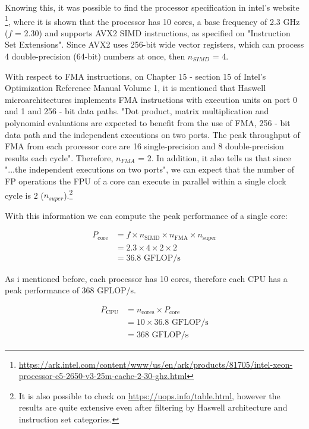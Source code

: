 \documentclass[unicode,11pt,a4paper,oneside,numbers=endperiod,openany]{scrartcl}
\begin{document}
Knowing this, it was possible to find the processor specification in intel's website \footnote{\url{https://ark.intel.com/content/www/us/en/ark/products/81705/intel-xeon-processor-e5-2650-v3-25m-cache-2-30-ghz.html}},
where it is shown that the processor has 10 cores, a base frequency of 2.3 GHz ($f$ = 2.30) and supports AVX2 SIMD instructions, as specified on "Instruction Set Extensions".
Since AVX2 uses 256-bit wide vector registers, which can process 4 double-precision (64-bit) numbers at once, then $n_{SIMD}$ = 4.

With respect to FMA instructions, on Chapter 15 - section 15 of Intel’s Optimization Reference Manual Volume 1, it is mentioned that Haswell microarchitectures implements FMA instructions with execution units on port 0 and 1 and 256 - bit data paths. 
"Dot product, matrix multiplication and polynomial evaluations are expected to benefit from the use of FMA, 256 - bit data path and the independent executions on two ports. The peak throughput of FMA from each processor core are 16 single-precision
and 8 double-precision results each cycle". Therefore, $n_{FMA}$ = 2. 
In addition, it also tells us that since "...the independent executions on two ports", we can expect that the number of FP operations the FPU of a core can execute in parallel within
a single clock cycle is 2 ($n_{super}$).\footnote{It is also possible to check on \url{https://uops.info/table.html}, however the results are quite extensive even after filtering by Haswell architecture and instruction set categories.}

With this information we can compute the peak performance of a single core: 

\begin{align*}
    P_{\text{core}} &= f \times n_{\text{SIMD}} \times n_{\text{FMA}} \times n_{\text{super}} \\
                    &= 2.3 \times 4 \times 2 \times 2 \\
                    &= 36.8 \text{ GFLOP/s}
\end{align*}

As i mentioned before, each processor has 10 cores, therefore each CPU has a peak performance of 368 GFLOP/s.

\begin{align*}
    P_{\text{CPU}} &= n_{\text{cores}} \times P_{\text{core}} \\
                    &= 10 \times 36.8 \text{ GFLOP/s} \\
                    &= 368 \text{ GFLOP/s}
\end{align*}
\end{document}
